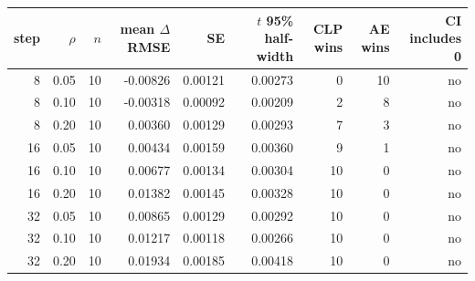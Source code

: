 \begin{tabular}{rrrrrrrrr}
\toprule
step & $\rho$ & $n$ & mean $\Delta$RMSE & SE & $t$ 95\% half-width & CLP wins & AE wins & CI includes 0 \\
\midrule
8 & 0.05 & 10 & -0.00826 & 0.00121 & 0.00273 & 0 & 10 & no \\
8 & 0.10 & 10 & -0.00318 & 0.00092 & 0.00209 & 2 & 8 & no \\
8 & 0.20 & 10 & 0.00360 & 0.00129 & 0.00293 & 7 & 3 & no \\
16 & 0.05 & 10 & 0.00434 & 0.00159 & 0.00360 & 9 & 1 & no \\
16 & 0.10 & 10 & 0.00677 & 0.00134 & 0.00304 & 10 & 0 & no \\
16 & 0.20 & 10 & 0.01382 & 0.00145 & 0.00328 & 10 & 0 & no \\
32 & 0.05 & 10 & 0.00865 & 0.00129 & 0.00292 & 10 & 0 & no \\
32 & 0.10 & 10 & 0.01217 & 0.00118 & 0.00266 & 10 & 0 & no \\
32 & 0.20 & 10 & 0.01934 & 0.00185 & 0.00418 & 10 & 0 & no \\
\bottomrule
\end{tabular}
